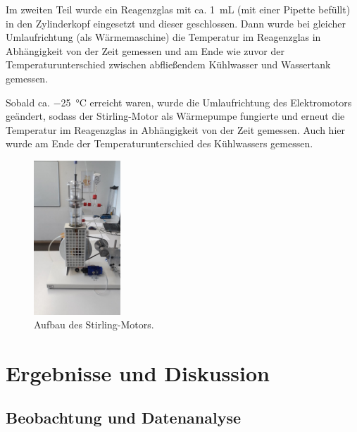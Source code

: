 \documentclass[
	a4paper,
	12pt,
	pagesize,
	ngerman
]{scrartcl}
\begin{document}
	Im zweiten Teil wurde ein Reagenzglas mit ca. \SI{1}{\milli \liter} (mit einer Pipette befüllt) in den Zylinderkopf eingesetzt und dieser geschlossen.
	Dann wurde bei gleicher Umlaufrichtung (als Wärmemaschine) die Temperatur im Reagenzglas in Abhängigkeit von der Zeit gemessen und am Ende wie zuvor der Temperaturunterschied zwischen abfließendem Kühlwasser und Wassertank gemessen.
	
	Sobald ca. \SI{-25}{\degreeCelsius} erreicht waren, wurde die Umlaufrichtung des Elektromotors geändert, sodass der Stirling-Motor als Wärmepumpe fungierte und erneut die Temperatur im Reagenzglas in Abhängigkeit von der Zeit gemessen.
	Auch hier wurde am Ende der Temperaturunterschied des Kühlwassers gemessen.
	
	\begin{figure}[H]
		\includegraphics[width=0.29\textwidth]{Aufbau}
		\centering
		\caption{Aufbau des Stirling-Motors.}
		\label{Aufbau}
		\centering
	\end{figure} 

	\section{Ergebnisse und Diskussion}
	

	\subsection{Beobachtung und Datenanalyse}
	
\end{document}
